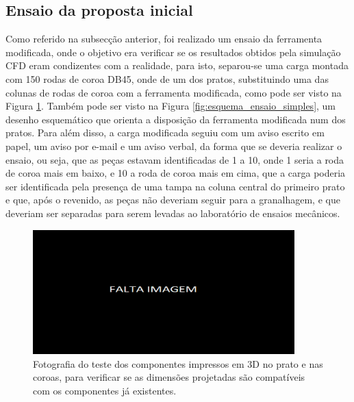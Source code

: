 \subsection{Ensaio da proposta inicial} \label{ssec:materiais_ensaio_simples}
Como referido na subsecção anterior, foi realizado um ensaio da ferramenta modificada, onde o objetivo era verificar se os resultados obtidos pela simulação CFD eram condizentes com a realidade, para isto, separou-se uma carga montada com 150 rodas de coroa DB45, onde de um dos pratos, substituindo uma das colunas de rodas de coroa com a ferramenta modificada, como pode ser visto na Figura \ref{fig:ensaio_simples}. Também pode ser visto na Figura \ref{fig:esquema_ensaio_simples}, um desenho esquemático que orienta a disposição da ferramenta modificada num dos pratos. Para além disso, a carga modificada seguiu com um aviso escrito em papel, um aviso por e-mail e um aviso verbal, da forma que se deveria realizar o ensaio, ou seja, que as peças estavam identificadas de 1 a 10, onde 1 seria a roda de coroa mais em baixo, e 10 a roda de coroa mais em cima, que a carga poderia ser identificada pela presença de uma tampa na coluna central do primeiro prato e que, após o revenido, as peças não deveriam seguir para a granalhagem, e que deveriam ser separadas para serem levadas ao laboratório de ensaios mecânicos.
\begin{figure}[htb]
    \centering
    \includegraphics[width = 0.9\textwidth]{Figures/Cap3/Falta_imagem_larga.png}
    \caption[Teste dos componentes impressos em 3D no prato e nas coroas]%
    {Fotografia do teste dos componentes impressos em 3D no prato e nas coroas, para verificar se as dimensões projetadas são compatíveis com os componentes já existentes.}
    \label{fig:ensaio_simples}
\end{figure}

